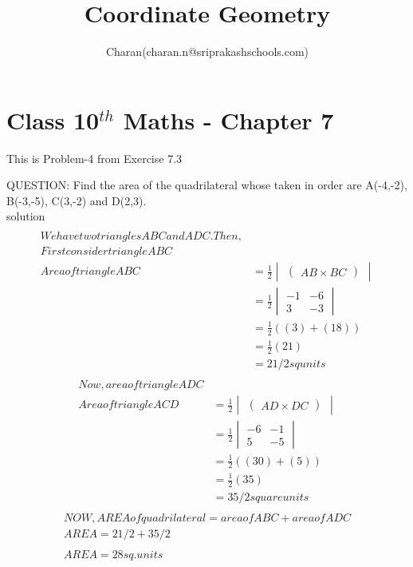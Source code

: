 \documentclass[12pt]{article}
\title{Coordinate Geometry}
\author{Charan(charan.n@sriprakashschools.com)}
\newcommand{\myvec}[1]{\ensuremath{\begin{pmatrix}#1\end{pmatrix}}}
\newcommand{\mydet}[1]{\ensuremath{\begin{vmatrix}#1\end{vmatrix}}}
\newcommand{\solution}{\noindent \textbf{Solution: }}
\begin{document}
\maketitle
\section{Class 10$^{th}$ Maths - Chapter 7}
This is Problem-4 from Exercise 7.3
\item  QUESTION: Find the area of the quadrilateral whose taken in order are A(-4,-2), B(-3,-5), C(3,-2) and D(2,3).
\\solution \\
\begin{align}
\\We have two triangles ABC and ADC.
Then,
\\First consider triangle ABC 
\\Area of triangle ABC&=\frac{1}{2}\mydet{ \myvec {AB\times BC}}\\&=\frac{1}{2}\mydet{ {-1}&{-6}\\{3}&{-3}}\\ &=\frac{1}{2}\left((3)+(18)\right)\\&=\frac{1}{2}(21)\\&=21/2 sq units
\end{align}
\begin{align}
\\Now, area of triangle ADC
\\Area of triangle ACD&=\frac{1}{2}\mydet{ \myvec {AD\times DC}}\\&=\frac{1}{2}\mydet{ {-6}&{-1} \\{5}&{-5}}\\ &=\frac{1}{2}\left((30)+(5)\right)\\&=\frac{1}{2}(35)\\&=35/2 square units
\end{align}
\begin{align}
\\NOW,AREA of quadrilateral = area of ABC + area of ADC
\\AREA = 21/2 + 35/2\\
\\AREA = 28 sq.units
\end{align}
\end{document}
